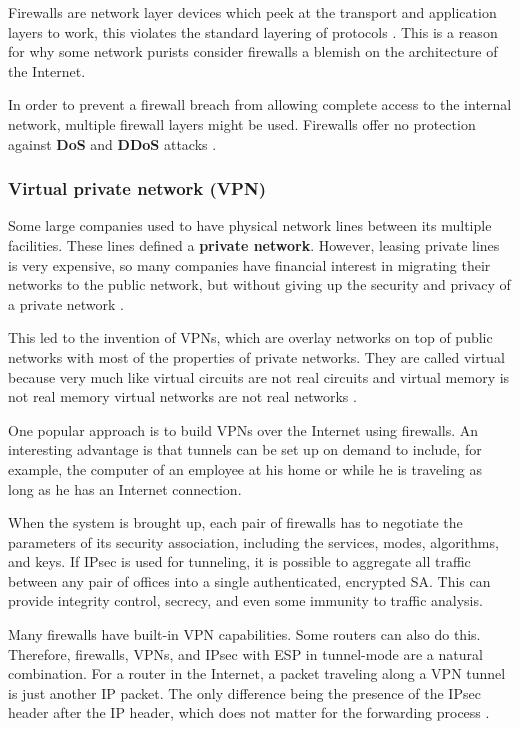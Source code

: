 Firewalls are network layer devices which peek at the transport and application layers to work, this violates the standard layering of protocols \cite[p.~820]{computer-networks-tanenbaum-2012}.
This is a reason for why some network purists consider firewalls a blemish on the architecture of the Internet.

In order to prevent a firewall breach from allowing complete access to the internal network, multiple firewall layers might be used.
Firewalls offer no protection against \textbf{DoS} and \textbf{DDoS} attacks \cite[p.~820]{computer-networks-tanenbaum-2012}.

\subsubsection{Virtual private network (VPN)}

Some large companies used to have physical network lines between its multiple facilities.
These lines defined a \textbf{private network}.
However, leasing private lines is very expensive, so many companies have financial interest in migrating their networks to the public network, but without giving up the security and privacy of a private network \cite[p.~821]{computer-networks-tanenbaum-2012}.

This led to the invention of VPNs, which are overlay networks on top of public networks with most of the properties of private networks.
They are called virtual because very much like virtual circuits are not real circuits and virtual memory is not real memory virtual networks are not real networks \cite[p.~821]{computer-networks-tanenbaum-2012}.

One popular approach is to build VPNs over the Internet using firewalls. An interesting advantage is that tunnels can be set up on demand to include, for example, the computer of an employee at his home or while he is traveling as long as he has an Internet connection.

When the system is brought up, each pair of firewalls has to negotiate the parameters of its security association, including the services, modes, algorithms, and keys. If IPsec is used for tunneling, it is possible to aggregate all traffic between any pair of offices into a single authenticated, encrypted SA. This can provide integrity control, secrecy, and even some immunity to traffic analysis.

Many firewalls have built-in VPN capabilities.
Some routers can also do this. Therefore, firewalls, VPNs, and IPsec with ESP in tunnel-mode are a natural combination.
For a router in the Internet, a packet traveling along a VPN tunnel is just another IP packet.
The only difference being the presence of the IPsec header after the IP header, which does not matter for the forwarding process \cite[p.~822]{computer-networks-tanenbaum-2012}.

